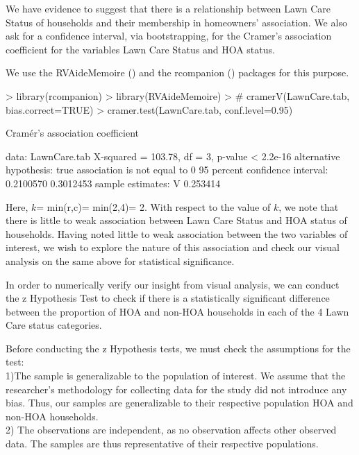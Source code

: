 \documentclass{article}
\begin{document}
We have evidence to suggest that there is a relationship between Lawn Care Status of households and their membership in homeowners' association. We also ask for a confidence interval, via bootstrapping, for the Cramer's association coefficient for the variables Lawn Care Status and HOA status. 

We use the RVAideMemoire (\cite{rvaidememoire}) and the rcompanion (\cite{rcompanion}) packages for this purpose.

\begin{Schunk}
\begin{Sinput}
> library(rcompanion)
> library(RVAideMemoire)
> # cramerV(LawnCare.tab, bias.correct=TRUE)
> cramer.test(LawnCare.tab, conf.level=0.95)
\end{Sinput}
\begin{Soutput}
	Cramér's association coefficient

data:  LawnCare.tab
X-squared = 103.78, df = 3, p-value < 2.2e-16
alternative hypothesis: true association is not equal to 0
95 percent confidence interval:
 0.2100570 0.3012453
sample estimates:
       V 
0.253414 
\end{Soutput}
\end{Schunk}

Here, $k$= min(r,c)= min(2,4)= 2. With respect to the value of $k$, we note that there is little to weak association between Lawn Care Status and HOA status of households. Having noted little to weak association between the two variables of interest, we wish to explore the nature of this association and check our visual analysis on the same above for statistical significance.

In order to numerically verify our insight from visual analysis, we can conduct the z Hypothesis Test to check if there is a statistically significant difference between the proportion of HOA and non-HOA households in each of the 4 Lawn Care status categories.

Before conducting the z Hypothesis tests, we must check the assumptions for the test:\\

1)The sample is generalizable to the population of interest. We assume that the researcher's methodology for collecting data for the study did not introduce any bias. Thus, our samples are generalizable to their respective population HOA and non-HOA households.\\

2) The observations are independent, as no observation affects other observed data. The samples are thus representative of their respective populations.\\
\end{document}
